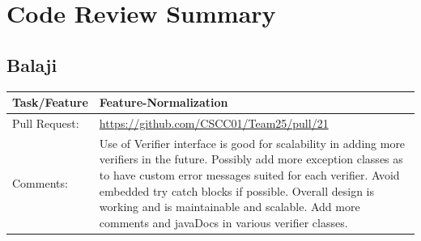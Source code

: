 \documentclass[12pt]{article}
\begin{document}
\section{Code Review Summary}
\subsection{Balaji} 
\begin{table}[H]
\begin{tabular}{|p{3cm}|p{11cm}|}
\hline
Task/Feature  & Feature-Normalization                                                                                                                                                                                                                                                                                                                                         \\ \hline
Pull Request: & \url{https://github.com/CSCC01/Team25/pull/21}                                                                                                                                                                                                                                                                                                                      \\ \hline
Comments:     & Use of Verifier interface is good for scalability in adding more verifiers in the future. Possibly add more exception classes as to have custom error messages suited for each verifier. Avoid embedded try catch blocks if possible. Overall design is working and is maintainable and scalable. Add more comments and javaDocs in various verifier classes. \\ \hline
\end{tabular}
\end{table}
\end{document}
